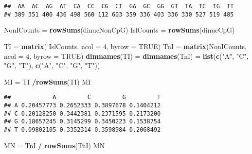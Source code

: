 \documentclass[]{article}
\newenvironment{Shaded}{\begin{snugshade}}{\end{snugshade}}
\newcommand{\KeywordTok}[1]{\textcolor[rgb]{0.13,0.29,0.53}{\textbf{#1}}}
\newcommand{\DataTypeTok}[1]{\textcolor[rgb]{0.13,0.29,0.53}{#1}}
\newcommand{\DecValTok}[1]{\textcolor[rgb]{0.00,0.00,0.81}{#1}}
\newcommand{\StringTok}[1]{\textcolor[rgb]{0.31,0.60,0.02}{#1}}
\newcommand{\OtherTok}[1]{\textcolor[rgb]{0.56,0.35,0.01}{#1}}
\newcommand{\OperatorTok}[1]{\textcolor[rgb]{0.81,0.36,0.00}{\textbf{#1}}}
\newcommand{\NormalTok}[1]{#1}
\begin{document}
\begin{verbatim}
##  AA  AC  AG  AT  CA  CC  CG  CT  GA  GC  GG  GT  TA  TC  TG  TT 
## 389 351 400 436 498 560 112 603 359 336 403 336 330 527 519 485
\end{verbatim}

\begin{Shaded}
\begin{Highlighting}[]
\NormalTok{NonICounts =}\StringTok{ }\KeywordTok{rowSums}\NormalTok{(dinucNonCpG)}
\NormalTok{IslCounts  =}\StringTok{ }\KeywordTok{rowSums}\NormalTok{(dinucCpG)}
\end{Highlighting}
\end{Shaded}

\begin{Shaded}
\begin{Highlighting}[]
\NormalTok{TI  =}\StringTok{ }\KeywordTok{matrix}\NormalTok{( IslCounts, }\DataTypeTok{ncol =} \DecValTok{4}\NormalTok{, }\DataTypeTok{byrow =} \OtherTok{TRUE}\NormalTok{)}
\NormalTok{TnI =}\StringTok{ }\KeywordTok{matrix}\NormalTok{(NonICounts, }\DataTypeTok{ncol =} \DecValTok{4}\NormalTok{, }\DataTypeTok{byrow =} \OtherTok{TRUE}\NormalTok{)}
\KeywordTok{dimnames}\NormalTok{(TI) =}\StringTok{ }\KeywordTok{dimnames}\NormalTok{(TnI) =}
\StringTok{  }\KeywordTok{list}\NormalTok{(}\KeywordTok{c}\NormalTok{(}\StringTok{"A"}\NormalTok{, }\StringTok{"C"}\NormalTok{, }\StringTok{"G"}\NormalTok{, }\StringTok{"T"}\NormalTok{), }\KeywordTok{c}\NormalTok{(}\StringTok{"A"}\NormalTok{, }\StringTok{"C"}\NormalTok{, }\StringTok{"G"}\NormalTok{, }\StringTok{"T"}\NormalTok{))}
\end{Highlighting}
\end{Shaded}

\begin{Shaded}
\begin{Highlighting}[]
\NormalTok{MI =}\StringTok{ }\NormalTok{TI }\OperatorTok{/}\KeywordTok{rowSums}\NormalTok{(TI)}
\NormalTok{MI}
\end{Highlighting}
\end{Shaded}

\begin{verbatim}
##            A         C         G         T
## A 0.20457773 0.2652333 0.3897678 0.1404212
## C 0.20128250 0.3442381 0.2371595 0.2173200
## G 0.18657245 0.3145299 0.3450223 0.1538754
## T 0.09802105 0.3352314 0.3598984 0.2068492
\end{verbatim}

\begin{Shaded}
\begin{Highlighting}[]
\NormalTok{MN =}\StringTok{ }\NormalTok{TnI }\OperatorTok{/}\StringTok{ }\KeywordTok{rowSums}\NormalTok{(TnI)}
\NormalTok{MN}
\end{Highlighting}
\end{Shaded}
\end{document}
